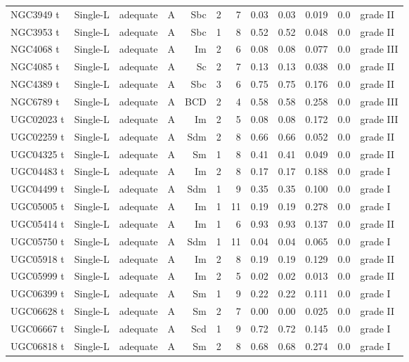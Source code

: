 \documentclass[10pt]{article}
\begin{document}
\begin{landscape}
{\begin{longtable}{llllrrrrrrrl}
NGC3949 t & Single-L & adequate & A & Sbc & 2 & 7 & 0.03 & 0.03 & 0.019 & 0.0 & grade II\\
NGC3953 t & Single-L & adequate & A & Sbc & 1 & 8 & 0.52 & 0.52 & 0.048 & 0.0 & grade II\\
NGC4068 t & Single-L & adequate & A & Im & 2 & 6 & 0.08 & 0.08 & 0.077 & 0.0 & grade III\\
NGC4085 t & Single-L & adequate & A & Sc & 2 & 7 & 0.13 & 0.13 & 0.038 & 0.0 & grade II\\
NGC4389 t & Single-L & adequate & A & Sbc & 3 & 6 & 0.75 & 0.75 & 0.176 & 0.0 & grade II\\
NGC6789 t & Single-L & adequate & A & BCD & 2 & 4 & 0.58 & 0.58 & 0.258 & 0.0 & grade III\\
UGC02023 t & Single-L & adequate & A & Im & 2 & 5 & 0.08 & 0.08 & 0.172 & 0.0 & grade III\\
UGC02259 t & Single-L & adequate & A & Sdm & 2 & 8 & 0.66 & 0.66 & 0.052 & 0.0 & grade II\\
UGC04325 t & Single-L & adequate & A & Sm & 1 & 8 & 0.41 & 0.41 & 0.049 & 0.0 & grade II\\
UGC04483 t & Single-L & adequate & A & Im & 2 & 8 & 0.17 & 0.17 & 0.188 & 0.0 & grade I\\
UGC04499 t & Single-L & adequate & A & Sdm & 1 & 9 & 0.35 & 0.35 & 0.100 & 0.0 & grade I\\
UGC05005 t & Single-L & adequate & A & Im & 1 & 11 & 0.19 & 0.19 & 0.278 & 0.0 & grade I\\
UGC05414 t & Single-L & adequate & A & Im & 1 & 6 & 0.93 & 0.93 & 0.137 & 0.0 & grade II\\
UGC05750 t & Single-L & adequate & A & Sdm & 1 & 11 & 0.04 & 0.04 & 0.065 & 0.0 & grade I\\
UGC05918 t & Single-L & adequate & A & Im & 2 & 8 & 0.19 & 0.19 & 0.129 & 0.0 & grade II\\
UGC05999 t & Single-L & adequate & A & Im & 2 & 5 & 0.02 & 0.02 & 0.013 & 0.0 & grade II\\
UGC06399 t & Single-L & adequate & A & Sm & 1 & 9 & 0.22 & 0.22 & 0.111 & 0.0 & grade I\\
UGC06628 t & Single-L & adequate & A & Sm & 2 & 7 & 0.00 & 0.00 & 0.025 & 0.0 & grade II\\
UGC06667 t & Single-L & adequate & A & Scd & 1 & 9 & 0.72 & 0.72 & 0.145 & 0.0 & grade I\\
UGC06818 t & Single-L & adequate & A & Sm & 2 & 8 & 0.68 & 0.68 & 0.274 & 0.0 & grade I\\

\end{longtable}}
\end{landscape}
\end{document}
